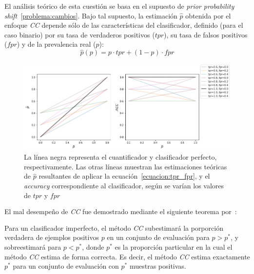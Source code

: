 El análisis teórico de esta cuestión se basa en el supuesto de {\it prior
probability shift\/}~\ref{problema:cambios}. Bajo tal supuesto, la estimación
$\hat p$ obtenida por el enfoque {\it CC\/} depende sólo de las características
del clasificador, definido (para el caso binario) por su tasa de verdaderos
positivos ($tpr$), su tasa de falsos positivos ($fpr$) y de la prevalencia real
($p$):
\begin{equation}\label{ecuacion:tpr_fpr}
    \hat p(p) = p \cdot {tpr} + (1-p) \cdot {fpr}
\end{equation}
\begin{figure}[h]
    \includegraphics[width=\textwidth]{../plots_teoria/cc_tpr_fpr.png}
    \caption{La línea negra representa el cuantificador y clasificador perfecto,
    respectivamente. Las otras líneas muestran las estimaciones teóricas de
    $\hat p$ resultantes de aplicar la ecuación~\ref{ecuacion:tpr_fpr}, y el
    {\it accuracy\/} correspondiente al clasificador, según se varían los
    valores de $tpr$ y $fpr$}\label{fig:cc_tpr_fpr}
\end{figure}

El mal desempeño de {\it CC\/} fue demostrado mediante el siguiente teorema
por~\citeauthor{forman2008quantifying}:

\begin{theorem}
    \citep[p.169]{forman2008quantifying}\label{teorema:forman} Para un
    clasificador imperfecto, el método {\it CC\/} subestimará la porporción
    verdadera de ejemplos positivos $p$ en un conjunto de evaluación para
    $p>p^*$, y sobreestimará para $p<p^*$, donde $p^*$ es la proporción
    particular en la cual el método {\it CC\/} estima de forma correcta. Es
    decir, el método {\it CC\/} estima exactamente $p^*$ para un conjunto de
    evaluación con $p^*$ muestras positivas.
\end{theorem}

